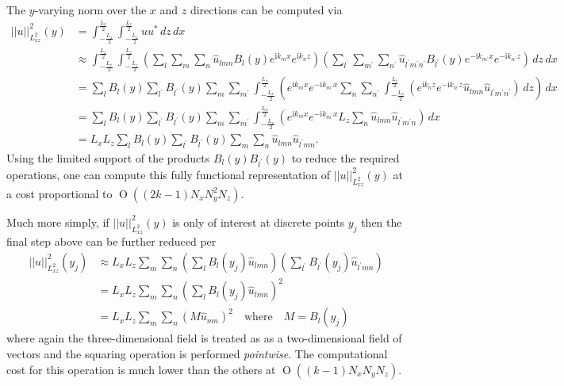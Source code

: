 \documentclass[letterpaper,11pt,nointlimits,reqno]{amsart}
\newcommand{\ii}{\ensuremath{\mathrm{i}}}
\newcommand{\OO}[1]{\operatorname{O}\left(#1\right)}
\begin{document}
The $y$-varying norm over the $x$ and $z$ directions can be computed via
\begin{align}
  \left|\left|
    u
  \right|\right|^{2}_{L^{2}_{xz}}
  \!(y)
&=
  \int_{-\frac{L_x}{2}}^{\frac{L_x}{2}}
  \int_{-\frac{L_z}{2}}^{\frac{L_z}{2}}
  u
  u^{\ast}
  \,d\!z \,d\!x
\\ &\approx
  \int_{-\frac{L_x}{2}}^{\frac{L_x}{2}}
  \int_{-\frac{L_z}{2}}^{\frac{L_z}{2}}
  \left(
    \sum_{l}\sum_{m}\sum_{n}
    \hat{u}_{l m n}B_l\!\left(y\right)e^{\ii k_m x}e^{\ii k_n z}
  \right)
  \left(
    \sum_{l^\prime}\sum_{m^\prime}\sum_{n^\prime}
    \hat{u}_{l^\prime m^\prime n^\prime}
    B_{l^\prime}\!\left(y\right)e^{-\ii k_{m^\prime} x}e^{-\ii k_{n^\prime} z}
  \right)
  \,d\!z \,d\!x
\\ &=
  \sum_{l}
  B_l\!\left(y\right)
  \sum_{l^\prime}
  B_{l^\prime}\!\left(y\right)
  \sum_{m}
  \sum_{m^\prime}
  \int_{-\frac{L_x}{2}}^{\frac{L_x}{2}}
  \left(
    e^{\ii k_m x}
    e^{-\ii k_{m^\prime} x}
    \sum_{n}
    \sum_{n^\prime}
    \int_{-\frac{L_z}{2}}^{\frac{L_z}{2}}
    \left(
      e^{\ii k_n z}
      e^{-\ii k_{n^\prime} z}
      \hat{u}_{l m n}
      \hat{u}_{l^\prime m^\prime n^\prime}
    \right)
    \,d\!z
  \right)
  \,d\!x
\\ &=
  \sum_{l}
  B_l\!\left(y\right)
  \sum_{l^\prime}
  B_{l^\prime}\!\left(y\right)
  \sum_{m}
  \sum_{m^\prime}
  \int_{-\frac{L_x}{2}}^{\frac{L_x}{2}}
  \left(
    e^{\ii k_m x}
    e^{-\ii k_{m^\prime} x}
    L_z \sum_{n} \hat{u}_{l m n} \hat{u}_{l^\prime m^\prime n}
  \right)
  \,d\!x
\\ &=
  L_x L_z
  \sum_{l}
  B_l\!\left(y\right)
  \sum_{l^\prime}
  B_{l^\prime}\!\left(y\right)
  \sum_{m} \sum_{n} \hat{u}_{l m n} \hat{u}_{l^\prime m n}
  .
\end{align}
Using the limited support of the products $B_l\left(y\right)
B_{l^\prime}\left(y\right)$ to reduce the required operations, one can compute
this fully functional representation of $\left|\left| u
\right|\right|^{2}_{L^{2}_{xz}} \!(y)$ at a cost proportional to
$\OO{\left(2k-1\right) N_x N_y^2 N_z}$.

Much more simply, if $\left|\left|u\right|\right|^{2}_{L^{2}_{xz}} \!(y)$ is
only of interest at discrete points $y_j$ then the final step above can be
further reduced per
\begin{align}
  \left|\left|
    u
  \right|\right|^{2}_{L^{2}_{xz}}
  \!(y_j)
&\approx
  L_x L_z
  \sum_{m} \sum_{n}
  \left(
    \sum_{l}
    B_l\!\left(y_j\right)
    \hat{u}_{l m n}
  \right)
  \left(
    \sum_{l^\prime}
    B_{l^\prime}\!\left(y_j\right)
    \hat{u}_{l^\prime m n}
  \right)
\\ &=
  L_x L_z
  \sum_{m} \sum_{n}
  \left(
    \sum_{l}
    B_l\!\left(y_j\right)
    \hat{u}_{l m n}
  \right)^{2}
\\ &=
  L_x L_z
  \sum_{m} \sum_{n}
  \left(
    M \hat{u}_{m n}
  \right)^{2}
   \quad\text{where}\quad
   M = B_l\!\left(y_j\right)
\end{align}
where again the three-dimensional field is treated as as a two-dimensional
field of vectors and the squaring operation is performed \emph{pointwise}.  The
computational cost for this operation is much lower than the others at
$\OO{\left(k-1\right)N_x N_y N_z}$.
\end{document}
